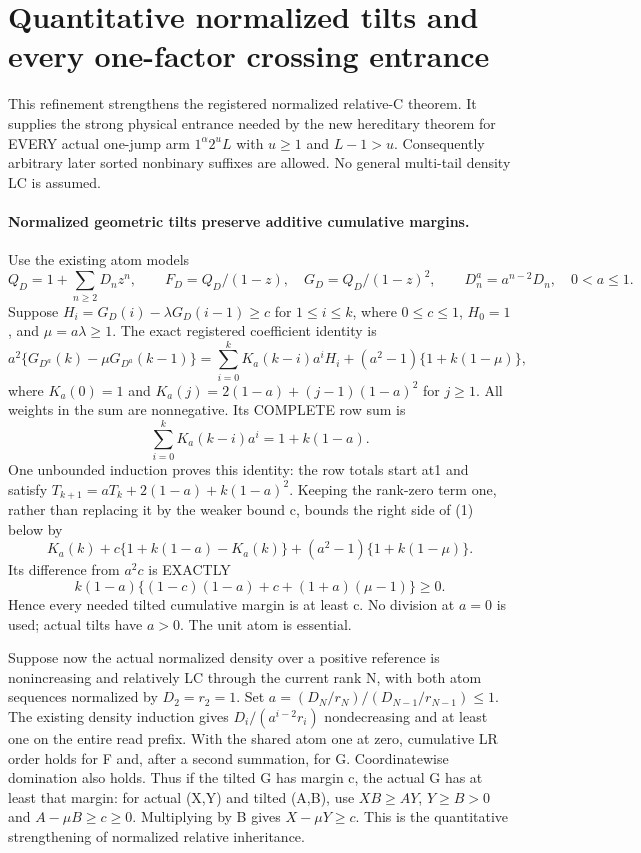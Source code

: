 \section{Quantitative normalized tilts and every one-factor crossing entrance}
This refinement strengthens the registered normalized relative-C theorem.
It supplies the strong physical entrance needed by the new hereditary
theorem for EVERY actual one-jump arm $1^\alpha2^uL$ with
$u\ge1$ and $L-1>u$. Consequently arbitrary later sorted nonbinary
suffixes are allowed. No general multi-tail density LC is assumed.

\paragraph{Normalized geometric tilts preserve additive cumulative margins.}
Use the existing atom models
\[
 Q_D=1+\sum_{n\ge2}D_nz^n,\qquad
 F_D=Q_D/(1-z),\quad G_D=Q_D/(1-z)^2,
 \qquad D^a_n=a^{n-2}D_n,\quad0<a\le1.
\]
Suppose $H_i=G_D(i)-\lambda G_D(i-1)\ge c$ for $1\le i\le k$,
where $0\le c\le1$, $H_0=1$, and $\mu=a\lambda\ge1$.
The exact registered coefficient identity is
\[
 a^2\{G_{D^a}(k)-\mu G_{D^a}(k-1)\}
 =\sum_{i=0}^k K_a(k-i)a^iH_i
       +(a^2-1)\{1+k(1-\mu)\},                       \tag{1}
\]
where $K_a(0)=1$ and
$K_a(j)=2(1-a)+(j-1)(1-a)^2$ for $j\ge1$.
All weights in the sum are nonnegative. Its COMPLETE row sum is
\[
 \sum_{i=0}^kK_a(k-i)a^i=1+k(1-a).
\]
One unbounded induction proves this identity: the row totals start at1
and satisfy $T_{k+1}=aT_k+2(1-a)+k(1-a)^2$.
Keeping the rank-zero term one, rather than replacing it by the
weaker bound c, bounds the right side of (1) below by
\[
 K_a(k)+c\{1+k(1-a)-K_a(k)\}
       +(a^2-1)\{1+k(1-\mu)\}.
\]
Its difference from $a^2c$ is EXACTLY
\[
 k(1-a)\{(1-c)(1-a)+c+(1+a)(\mu-1)\}\ge0.           \tag{2}
\]
Hence every needed tilted cumulative margin is at least c.
No division at $a=0$ is used; actual tilts have $a>0$.
The unit atom is essential.

Suppose now the actual normalized density over a positive reference
is nonincreasing and relatively LC through the current rank N,
with both atom sequences normalized by $D_2=r_2=1$.
Set $a=(D_N/r_N)/(D_{N-1}/r_{N-1})\le1$.
The existing density induction gives $D_i/(a^{i-2}r_i)$ nondecreasing
and at least one on the entire read prefix.
With the shared atom one at zero, cumulative LR order holds for F
and, after a second summation, for G. Coordinatewise domination also holds.
Thus if the tilted G has margin c, the actual G has at least that margin:
for actual (X,Y) and tilted (A,B), use
$XB\ge AY$, $Y\ge B>0$ and $A-\mu B\ge c\ge0$.
Multiplying by B gives $X-\mu Y\ge c$.
This is the quantitative strengthening of normalized relative inheritance.

